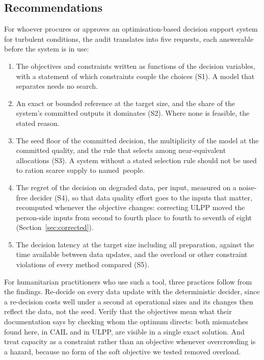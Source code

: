 \documentclass[systems,article,accept,moreauthors,pdftex]{Definitions/mdpi}
\begin{document}
\subsection{Recommendations}\label{sec:recommendations}
For whoever procures or approves an optimisation-based decision support system for turbulent
conditions, the audit translates into five requests, each answerable before the system is in use:
\begin{enumerate}[leftmargin=7.5mm,labelsep=0.5mm, topsep=3pt]
\item The objectives and constraints written as functions of the decision variables, with a
statement of which constraints couple the choices (S1). A model that separates needs no search.
\item An exact or bounded reference at the target size, and the share of the system's committed
outputs it dominates (S2). Where none is feasible, the stated reason.
\item The seed floor of the committed decision, the multiplicity of the model at the committed
quality, and the rule that selects among near-equivalent allocations (S3). A system without a
stated selection rule should not be used to ration scarce supply to \mbox{named people}.
\item The regret of the decision on degraded data, per input, measured on a noise-free decider
(S4), so that data quality effort goes to the inputs that matter, recomputed whenever the
objective changes: correcting ULPP moved the person-side inputs from second to fourth place to
fourth to seventh of eight (Section~\ref{sec:corrected}).
\item The decision latency at the target size including all preparation, against the time
available between data updates, and the overload or other constraint violations of every
method compared (S5).
\end{enumerate}

For humanitarian practitioners who use such a tool, three practices follow from the findings.
Re-decide on every data update with the deterministic decider, since a re-decision costs well
under a second at operational sizes and its changes then reflect the data, not the seed. Verify
that the objectives mean what their documentation says by checking whom the optimum directs:
both mismatches found here, in CAIL and in ULPP, are visible in a single exact solution. And
treat capacity as a constraint rather than an objective whenever overcrowding is a hazard,
because no form of the soft objective we tested removed overload.
\end{document}
